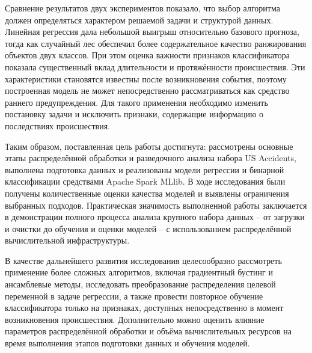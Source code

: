Сравнение результатов двух экспериментов показало, что выбор алгоритма должен определяться характером решаемой задачи и структурой данных. Линейная регрессия дала небольшой выигрыш относительно базового прогноза, тогда как случайный лес обеспечил более содержательное качество ранжирования объектов двух классов. При этом оценка важности признаков классификатора показала существенный вклад длительности и протяжённости происшествия. Эти характеристики становятся известны после возникновения события, поэтому построенная модель не может непосредственно рассматриваться как средство раннего предупреждения. Для такого применения необходимо изменить постановку задачи и исключить признаки, содержащие информацию о последствиях происшествия.

Таким образом, поставленная цель работы достигнута: рассмотрены основные этапы распределённой обработки и разведочного анализа набора US Accidents, выполнена подготовка данных и реализованы модели регрессии и бинарной классификации средствами Apache Spark MLlib. В ходе исследования были получены количественные оценки качества моделей и выявлены ограничения выбранных подходов. Практическая значимость выполненной работы заключается в демонстрации полного процесса анализа крупного набора данных -- от загрузки и очистки до обучения и оценки моделей -- с использованием распределённой вычислительной инфраструктуры.

В качестве дальнейшего развития исследования целесообразно рассмотреть применение более сложных алгоритмов, включая градиентный бустинг и ансамблевые методы, исследовать преобразование распределения целевой переменной в задаче регрессии, а также провести повторное обучение классификатора только на признаках, доступных непосредственно в момент возникновения происшествия. Дополнительно можно оценить влияние параметров распределённой обработки и объёма вычислительных ресурсов на время выполнения этапов подготовки данных и обучения моделей.